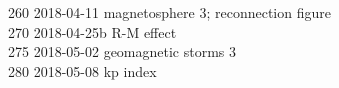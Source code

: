 \begin{footnotesize}
260	2018-04-11	magnetosphere 3; reconnection figure\\
270	2018-04-25b	R-M effect\\
275	2018-05-02	geomagnetic storms 3\\
280	2018-05-08	kp index\\

\end{footnotesize}
